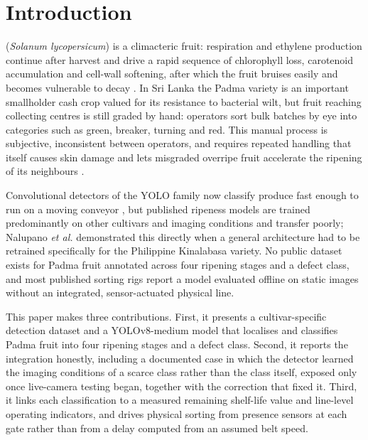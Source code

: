\documentclass[journal]{IEEEtran}
\begin{document}
\section{Introduction}
 (\textit{Solanum lycopersicum}) is a climacteric fruit: respiration and ethylene production continue after harvest and drive a rapid sequence of chlorophyll loss, carotenoid accumulation and cell-wall softening, after which the fruit bruises easily and becomes vulnerable to decay \cite{abekoon2024}. In Sri Lanka the Padma variety is an important smallholder cash crop valued for its resistance to bacterial wilt, but fruit reaching collecting centres is still graded by hand: operators sort bulk batches by eye into categories such as green, breaker, turning and red. This manual process is subjective, inconsistent between operators, and requires repeated handling that itself causes skin damage and lets misgraded overripe fruit accelerate the ripening of its neighbours \cite{abekoon2024}.

Convolutional detectors of the YOLO family now classify produce fast enough to run on a moving conveyor \cite{terven2023,redmon2016}, but published ripeness models are trained predominantly on other cultivars and imaging conditions and transfer poorly; Nalupano \textit{et al.} \cite{nalupano2024} demonstrated this directly when a general architecture had to be retrained specifically for the Philippine Kinalabasa variety. No public dataset exists for Padma fruit annotated across four ripening stages and a defect class, and most published sorting rigs report a model evaluated offline on static images without an integrated, sensor-actuated physical line.

This paper makes three contributions. First, it presents a cultivar-specific detection dataset and a YOLOv8-medium model that localises and classifies Padma fruit into four ripening stages and a defect class. Second, it reports the integration honestly, including a documented case in which the detector learned the imaging conditions of a scarce class rather than the class itself, exposed only once live-camera testing began, together with the correction that fixed it. Third, it links each classification to a measured remaining shelf-life value and line-level operating indicators, and drives physical sorting from presence sensors at each gate rather than from a delay computed from an assumed belt speed.
\end{document}
